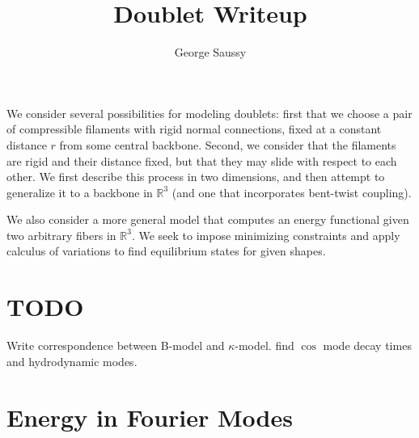 \documentclass{article}
\theoremstyle{exampstyle} \newtheorem*{remark}{Remark}
\newcommand{\1}{\mathds{1}}
\begin{document}
\title{Doublet Writeup}
\author{George Saussy}
\maketitle

We consider several possibilities for modeling doublets: first that we choose a pair of compressible filaments with rigid normal connections, fixed at a constant distance $r$ from some central backbone. Second, we consider that the filaments are rigid and their distance fixed, but that they may slide with respect to each other. We first describe this process in two dimensions, and then attempt to generalize it to a backbone in $\mathbb{R}^3$ (and one that incorporates bent-twist coupling).

We also consider a more general model that computes an energy functional given two arbitrary fibers in $\mathbb{R}^3$. We seek to impose minimizing constraints and apply calculus of variations to find equilibrium states for given shapes.

\section{TODO}

Write correspondence between B-model and $\kappa$-model. find $\cos$ mode decay times and hydrodynamic modes.



\section{Energy in Fourier Modes}
\end{document}
